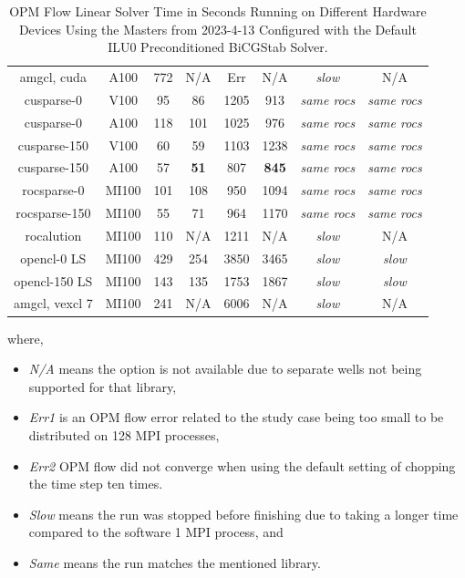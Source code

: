 \begin{table}[!h]
\begin{tabular}{c|c|c|c|c|c|c|c}
amgcl, cuda  & A100 & 772 & N/A & Err & N/A & \textit{slow} & N/A \\
cusparse-0    & V100 & 95 & 86 & 1205 & 913 & \textit{same rocs} & \textit{same rocs} \\
cusparse-0    & A100 & 118 & 101 & 1025 & 976 & \textit{same rocs} & \textit{same rocs} \\
cusparse-150  & V100 &  60 & 59 & 1103 & 1238 & \textit{same rocs} & \textit{same rocs} \\
cusparse-150  & A100 &  57 & \textbf{51} & 807 & \textbf{845} & \textit{same rocs} & \textit{same rocs} \\
rocsparse-0   & MI100& 101 & 108 & 950 & 1094 & \textit{same rocs} & \textit{same rocs} \\
rocsparse-150 & MI100&  55 &  71 & 964 & 1170 & \textit{same rocs} & \textit{same rocs} \\
rocalution    & MI100& 110 & N/A & 1211 & N/A & \textit{slow}& N/A\\
opencl-0 LS   & MI100& 429 & 254 & 3850 & 3465 & \textit{slow} & \textit{slow} \\
opencl-150 LS & MI100& 143 & 135 & 1753 & 1867 & \textit{slow} & \textit{slow} \\
amgcl, vexcl 7& MI100& 241 & N/A & 6006 & N/A & \textit{slow} & N/A \\
\end{tabular}
\caption{ OPM Flow Linear Solver Time in Seconds Running on Different Hardware Devices Using the Masters from 2023-4-13 Configured with the Default ILU0 Preconditioned BiCGStab Solver.}
\label{tab:lin_solver_times}
\end{table}

where, 

\begin{itemize}
    \item \textit{N/A} means the option is not available due to separate wells not being supported for that library,
    \item \textit{Err1} is an OPM flow error related to the study case being too small to be distributed on 128 MPI processes,
    \item \textit{Err2} OPM flow did not converge when using the default setting of chopping the time step ten times.
    \item \textit{Slow} means the run was stopped before finishing due to taking a longer time compared to the software 1 MPI process, and 
    \item \textit{Same} means the run matches the mentioned library.
\end{itemize}

